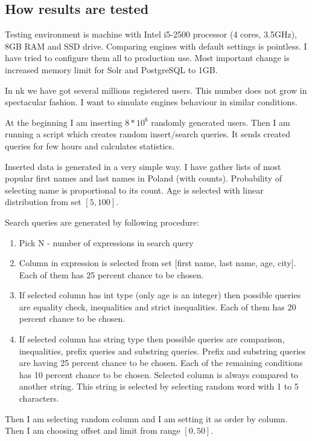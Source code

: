 \documentclass[10pt,a4paper]{article}
\begin{document}
\subsection{How results are tested}

Testing environment is machine with Intel i5-2500 processor (4 cores, 3.5GHz), 8GB RAM and SSD drive. Comparing engines with default settings is pointless. I have tried to configure them all to production use. Most important change is increased memory limit for Solr and PostgreSQL to 1GB.

In nk we have got several millions registered users. This number does not grow in spectacular fashion. I want to simulate engines behaviour in similar conditions. 

At the beginning I am inserting $8 * 10^6$ randomly generated users. Then I am running a script which creates random insert/search queries. It sends created queries for few hours and calculates statistics.

Inserted data is generated in a very simple way. I have gather lists of most popular first names and last names in Poland (with counts). Probability of selecting name is proportional to its count. Age is selected with linear distribution from set $[5, 100]$. 

Search queries are generated by following procedure:
\begin{enumerate}
\item Pick N - number of expressions in search query
\item Column in expression is selected from set [first name, last name, age, city]. Each of them has 25 percent chance to be chosen.
\item If selected column has int type (only age is an integer) then possible queries are equality check, inequalities and strict inequalities. Each of them has 20 percent chance to be chosen.
\item If selected column has string type then possible queries are comparison, inequalities, prefix queries and substring queries. Prefix and substring queries are having 25 percent chance to be chosen. Each of the remaining conditions has 10 percent chance to be chosen. Selected column is always compared to another string. This string is selected by selecting random word with 1 to 5 characters.
\end{enumerate}

Then I am selecting random column and I am setting it as order by column. Then I am choosing offset and limit from range $[0, 50]$.
\end{document}

